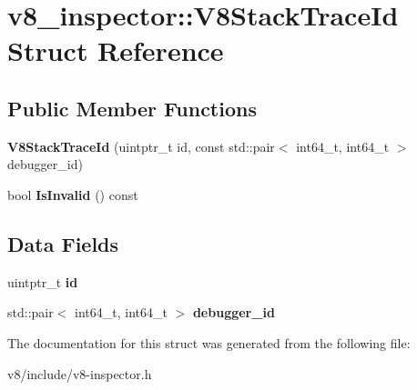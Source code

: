 \hypertarget{structv8__inspector_1_1V8StackTraceId}{}\section{v8\+\_\+inspector\+:\+:V8\+Stack\+Trace\+Id Struct Reference}
\label{structv8__inspector_1_1V8StackTraceId}
\subsection*{Public Member Functions}
\begin{DoxyCompactItemize}
\item 
\mbox{\label{structv8__inspector_1_1V8StackTraceId_a229d85e0a584d86a881b6ef575b1a9a2}} 
{\bfseries V8\+Stack\+Trace\+Id} (uintptr\+\_\+t id, const std\+::pair$<$ int64\+\_\+t, int64\+\_\+t $>$ debugger\+\_\+id)
\item 
\mbox{\label{structv8__inspector_1_1V8StackTraceId_a20fd4c6fe649f6663b7855f38681a211}} 
bool {\bfseries Is\+Invalid} () const
\end{DoxyCompactItemize}
\subsection*{Data Fields}
\begin{DoxyCompactItemize}
\item 
\mbox{\label{structv8__inspector_1_1V8StackTraceId_ad9e65194b2f95f1a9b98fdc76af8dae2}} 
uintptr\+\_\+t {\bfseries id}
\item 
\mbox{\label{structv8__inspector_1_1V8StackTraceId_aa64ad33eb9a49a373f87aaa5e0964500}} 
std\+::pair$<$ int64\+\_\+t, int64\+\_\+t $>$ {\bfseries debugger\+\_\+id}
\end{DoxyCompactItemize}


The documentation for this struct was generated from the following file\+:\begin{DoxyCompactItemize}
\item 
v8/include/v8-\/inspector.\+h\end{DoxyCompactItemize}
